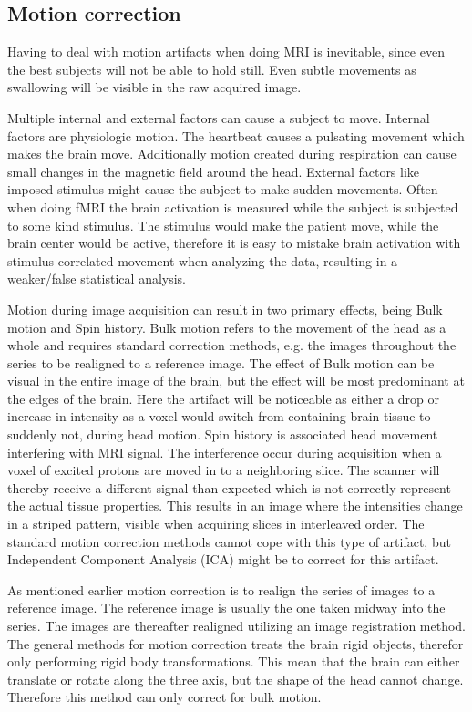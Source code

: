 \subsection{Motion correction}

Having to deal with motion artifacts when doing MRI is inevitable, since even the best subjects will not be able to hold still. Even subtle movements as swallowing will be visible in the raw acquired image.\cite{Poldrack2011} 

Multiple internal and external factors can cause a subject to move. Internal factors are physiologic motion. The heartbeat causes a pulsating movement which makes the brain move. Additionally motion created during respiration can cause small changes in the magnetic field around the head. External factors like imposed stimulus might cause the subject to make sudden movements. Often when doing fMRI the brain activation is measured while the subject is subjected to some kind stimulus. The stimulus would make the patient move, while the brain center would be active, therefore it is easy to mistake brain activation with stimulus correlated movement when analyzing the data, resulting in a weaker/false statistical analysis.\cite{Poldrack2011} 

Motion during image acquisition can result in two primary effects, being Bulk motion and Spin history. Bulk motion refers to the movement of the head as a whole and requires standard correction methods, e.g. the images throughout the series to be realigned to a reference image. The effect of Bulk motion can be visual in the entire image of the brain, but the effect will be most predominant at the edges of the brain. Here the artifact will be noticeable as either a drop or increase in intensity as a voxel would switch from containing brain tissue to suddenly not, during head motion.  
Spin history is associated head movement interfering with MRI signal. The interference occur during acquisition when a voxel of excited protons are moved in to a neighboring slice. The scanner will thereby receive a different signal than expected which is not correctly represent the actual tissue properties. This results in an image where the intensities change in a striped pattern, visible when acquiring slices in interleaved order. The standard motion correction methods cannot cope with this type of artifact, but Independent Component Analysis (ICA) might be to correct for this artifact.\cite{Poldrack2011} 

As mentioned earlier motion correction is to realign the series of images to a reference image. The reference image is usually the one taken midway into the series. The images are thereafter realigned utilizing an image registration method. The general methods for motion correction treats the brain rigid objects, therefor only performing rigid body transformations. This mean that the brain can either translate or rotate along the three axis, but the shape of the head cannot change. Therefore this method can only correct for bulk motion.\cite{Poldrack2011} 

